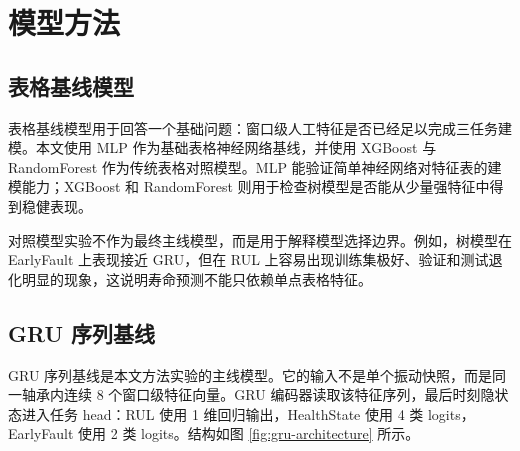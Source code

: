 \section{模型方法}

\subsection{表格基线模型}

表格基线模型用于回答一个基础问题：窗口级人工特征是否已经足以完成三任务建模。本文使用 MLP 作为基础表格神经网络基线，并使用 XGBoost 与 RandomForest 作为传统表格对照模型。MLP 能验证简单神经网络对特征表的建模能力；XGBoost 和 RandomForest 则用于检查树模型是否能从少量强特征中得到稳健表现。

对照模型实验不作为最终主线模型，而是用于解释模型选择边界。例如，树模型在 EarlyFault 上表现接近 GRU，但在 RUL 上容易出现训练集极好、验证和测试退化明显的现象，这说明寿命预测不能只依赖单点表格特征。

\subsection{GRU 序列基线}

GRU 序列基线是本文方法实验的主线模型。它的输入不是单个振动快照，而是同一轴承内连续 8 个窗口级特征向量。GRU 编码器读取该特征序列，最后时刻隐状态进入任务 head：RUL 使用 1 维回归输出，HealthState 使用 4 类 logits，EarlyFault 使用 2 类 logits。结构如图 \ref{fig:gru-architecture} 所示。

